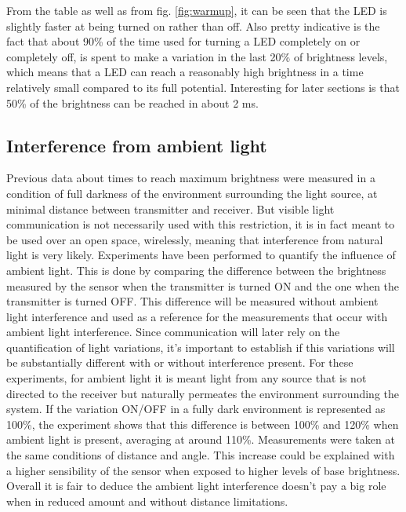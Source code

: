 From the table as well as from fig. \ref{fig:warmup}, it can be seen that the LED is slightly faster at being turned on rather than off.
Also pretty indicative is the fact that about 90\% of the time used for turning a LED completely on or completely off, is spent to make a variation in the last 20\% of brightness levels, which means that a LED can reach a reasonably high brightness in a time relatively small compared to its full potential.
Interesting for later sections is that 50\% of the brightness can be reached in about 2 ms.

\subsection{Interference from ambient light}
Previous data about times to reach maximum brightness were measured in a condition of full darkness of the environment surrounding the light source, at minimal distance between transmitter and receiver.
But visible light communication is not necessarily used with this restriction, it is in fact meant to be used over an open space, wirelessly,  meaning that interference from natural light is very likely.
 Experiments have been performed to quantify the influence of ambient light.
 This is done by comparing the difference between the brightness measured by the sensor when the transmitter is turned ON and the one when the transmitter is turned OFF.
 This difference will be measured without ambient light interference and used as a reference for the measurements that occur with ambient light interference.
 Since communication  will later rely on the quantification of light variations, it's important to establish if this variations will be substantially different with or without interference present.
 For these experiments, for ambient light it is meant light from any source that is not directed to the receiver but naturally permeates the environment surrounding the system.
 If the variation ON/OFF in a fully dark environment is represented as 100\%, the experiment shows that this difference is between 100\% and 120\% when ambient light is present, averaging at around 110\%. 
Measurements were taken at the same conditions of distance and angle.
This increase could be explained with a higher sensibility of the sensor when exposed to higher levels of base brightness.
Overall it is fair to deduce the ambient light interference doesn't pay a big role when in reduced amount and without distance limitations.


